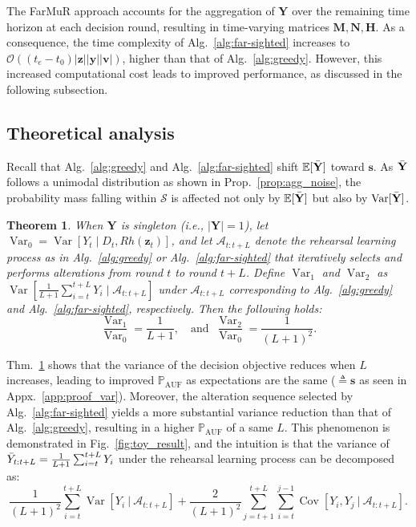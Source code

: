 \documentclass{article}
\theoremstyle{plain}
\newtheorem{theorem}{Theorem}[section]
\theoremstyle{definition}
\theoremstyle{remark}
\def \ie {\textit{i.e.}}
\def \Fig {Fig.}
\def \sA {\mathcal{A}}
\def \N {\mathbf{N}}
\def \sS {\mathcal{S}}
\def \Y {\mathbf{Y}}
\def \s {\mathbf{s}}
\def \M {\mathbf{M}}
\def \H {\mathbf{H}}
\def \v {\mathbf{v}}
\def \y {\mathbf{y}}
\def \z {\mathbf{z}}
\begin{document}
The FarMuR approach accounts for the aggregation of \(\Y\) over the remaining time horizon at each decision round, resulting in time-varying matrices \(\M, \N, \H\). 
As a consequence, the time complexity of Alg.~\ref{alg:far-sighted} increases to \(\mathcal{O}((t_e - t_0)|\z| |\y| |\v|)\), higher than that of Alg.~\ref{alg:greedy}. 
However, this increased computational cost leads to improved performance, as discussed in the following subsection.


\subsection{Theoretical analysis}
\label{sec:theorem}

Recall that Alg.~\ref{alg:greedy} and Alg.~\ref{alg:far-sighted} shift \(\mathbb{E}[\Bar{\Y}]\) toward \(\s\). 
As \(\Bar{\Y}\) follows a unimodal distribution as shown in Prop.~\ref{prop:agg_noise}, 
the probability mass falling within \(\sS\) is affected not only by \(\mathbb{E}[\Bar{\Y}]\) but also by \(\operatorname{Var}[\Bar{\Y}]\). 

\begin{theorem}
  \label{thm:var_red_2}
  When \(\Y\) is singleton (\ie, \(|\Y| = 1\)), let \(\operatorname{Var}_0 = \operatorname{Var}[Y_t \mid D_t, Rh(\z_t)]\), and let \(\sA_{t:t+L}\) denote the rehearsal learning process as in Alg.~\ref{alg:greedy} or Alg.~\ref{alg:far-sighted} that iteratively selects and performs alterations from round \(t\) to round \(t+L\). 
  Define \(\operatorname{Var}_1\) and \(\operatorname{Var}_2\) as \(\operatorname{Var}[\frac{1}{L+1}\sum_{i=t}^{t+L}Y_{i}\mid \sA_{t:t+L}]\) under \(\sA_{t:t+L}\) corresponding to Alg.~\ref{alg:greedy} and Alg.~\ref{alg:far-sighted}, respectively. Then the following holds:
  \[
    \frac{\operatorname{Var}_1}{\operatorname{Var}_0} = \frac{1}{L+1},\quad \text{and }\  \frac{\operatorname{Var}_2}{\operatorname{Var}_0} = \frac{1}{(L+1)^2}.
  \]
\end{theorem}
\vskip -0.03in



Thm.~\ref{thm:var_red_2} shows that the variance of the decision objective reduces when \(L\) increases, leading to improved \(\mathbb{P}_{\operatorname{AUF}}\) as expectations are the same (\(\triangleq\s\) as seen in Appx.~\ref{app:proof_var}). 
Moreover, the alteration sequence selected by Alg.~\ref{alg:far-sighted} yields a more substantial variance reduction than that of Alg.~\ref{alg:greedy}, 
resulting in a higher \(\mathbb{P}_{\operatorname{AUF}}\) of a same \(L\). 
This phenomenon is demonstrated in \Fig~\ref{fig:toy_result}, and the intuition is that the variance of \(\Bar{Y}_{t:t+L} = \frac{1}{L+1} \sum_{i=t}^{t+L} Y_i\) under the rehearsal learning process can be decomposed as:
\vskip -0.1in
\begin{equation}
  \label{eq:var}
   \frac{1}{(L+1)^2}\sum\limits_{i=t}^{t+L} \operatorname{Var}\left[Y_i\ \Big| \ \sA_{t:t+L}\right]  + \frac{2}{(L+1)^2}\sum\limits_{j=t+1}^{t+L}\sum\limits_{i=t}^{j-1} \operatorname{Cov}\left[Y_i, Y_j\ \Big| \ \sA_{t:t+L}\right].
\end{equation}
\vskip 0.01in
\end{document}
